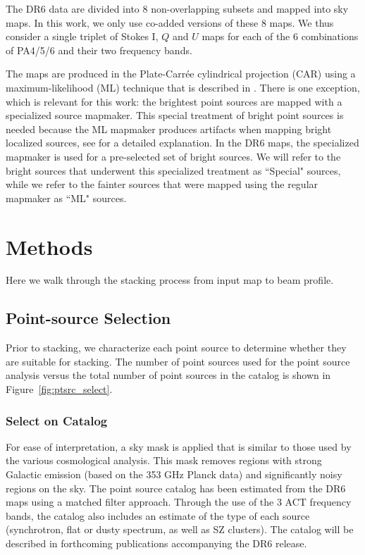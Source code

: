 The DR6 data are divided into 8 non-overlapping subsets and mapped into sky maps. In this work, we only use co-added versions of these 8 maps. We thus consider a single triplet of Stokes I, $Q$ and $U$ maps for each of the 6 combinations of PA4/5/6 and their two frequency bands. 

The maps are produced in the Plate-Carr\'{e}e cylindrical projection (CAR) using a maximum-likelihood (ML) technique that is described in \cite{aiola_2020}. There is one exception, which is relevant for this work: the brightest point sources are mapped with a specialized source mapmaker. This special treatment of bright point sources is needed because the ML mapmaker produces artifacts when mapping bright localized sources, see \cite{naess_2019} for a detailed explanation. In the DR6 maps, the specialized mapmaker is used for a pre-selected set of bright sources. We will refer to the bright sources that underwent this specialized treatment as ``Special" sources, while we refer to the fainter sources that were mapped using the regular mapmaker as ``ML" sources.

\section{Methods}
\label{sec:stack}
Here we walk through the stacking process from input map to beam profile.  

\subsection{Point-source Selection}
\label{subsec:ptsrc_sel}
Prior to stacking, we characterize each point source to determine whether they are suitable for stacking.  The number of point sources used for the point source analysis versus the total number of point sources in the catalog is shown in Figure~\ref{fig:ptsrc_select}.

\subsubsection{Select on Catalog}
\label{subsubsec:cat_sel}
For ease of interpretation, a sky mask is applied that is similar to those used by the various cosmological analysis. This mask removes regions with strong Galactic emission (based on the 353 GHz Planck data) and significantly noisy regions on the sky.  The point source catalog has been estimated from the DR6 maps using a matched filter approach. Through the use of the 3 ACT frequency bands, the catalog also includes an estimate of the type of each source (synchrotron, flat or dusty spectrum, as well as SZ clusters). The catalog will be described in forthcoming publications accompanying the DR6 release.

